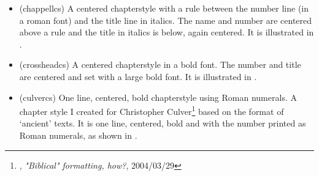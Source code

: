 \begin{itemize}


\item[\cstyle{chappell}] 
\glossary(chappellcs)%
  {}%
  { A centered chapterstyle with a rule between
   the number line (in a roman font) and the title line in italics.}
The name and number are centered above a rule and the
title in italics is below, again centered. It is illustrated in 
.


\item[\cstyle{crosshead}] 
\glossary(crossheadcs)%
  {}%
  { A centered chapterstyle in a bold font.}
The number and title are centered and set with a large bold font.
It is illustrated in 
.



\item[\cstyle{culver}] 
\glossary(culvercs)%
  {}%
  {One line, centered, bold chapterstyle using Roman numerals.}
A chapter style I created for 
  Christopher
  Culver\footnote{\ctt, \textit{"Biblical" formatting, how?}, 2004/03/29}
  based on the format of `ancient' texts.
 It is one line, centered, bold and with the number printed as Roman numerals,
as shown in .

\begin{comment}
\makechapterstyle{culver}{
  \chapterstyle{default}
  \chapterstyle{article}
  \renewcommand*{\thechapter}{\Roman{chapter}}
  \renewcommand*{\printchapternum}{%
    \centering\chapnumfont \thechapter\space\space}%
  \renewcommand*{\printchapternonum}{\centering}
  \renewcommand*{\clearforchapter}{}%
  \aliaspagestyle{chapter}{headings}%
}
\end{comment}



\end{itemize}
